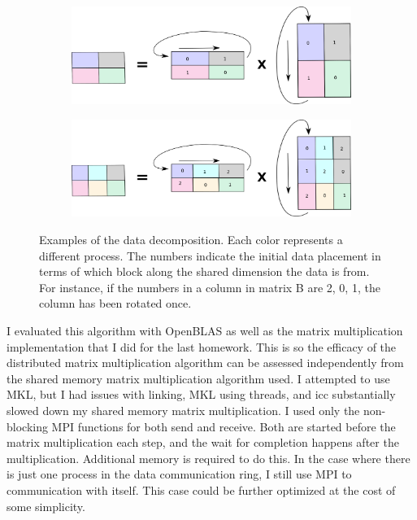 \documentclass{article}
\begin{document}
\begin{figure}
\begin{subfigure}{.9\textwidth}
  \centering
  \includegraphics[width=.9\linewidth]{figures/fig_2_2.png}
\end{subfigure}
\begin{subfigure}{.9\textwidth}
  \centering
  \includegraphics[width=.9\linewidth]{figures/fig_2_3.png}
\end{subfigure}
\caption{Examples of the data decomposition. Each color represents a different process. 
The numbers indicate the initial data placement in terms of which block along the shared dimension
the data is from. For instance, if the numbers in a column in matrix B are 2, 0, 1, the column has 
been rotated once.}
\label{fig:fig}
\end{figure}

I evaluated this algorithm with OpenBLAS as well as the matrix multiplication implementation that I did for 
the last homework. This is so the efficacy of the distributed matrix multiplication algorithm can
be assessed independently from the shared memory matrix multiplication algorithm used. I attempted to use
MKL, but I had issues with linking, MKL using threads, and icc substantially slowed down my shared
memory matrix multiplication. I used only the
non-blocking MPI functions for both send and receive. Both are started before the matrix multiplication
each step, and the wait for completion happens after the multiplication. Additional memory
is required to do this. In the case where there is just one process in the data communication ring,
I still use MPI to communication with itself. This case could be further optimized at the cost of some
simplicity.
\end{document}
